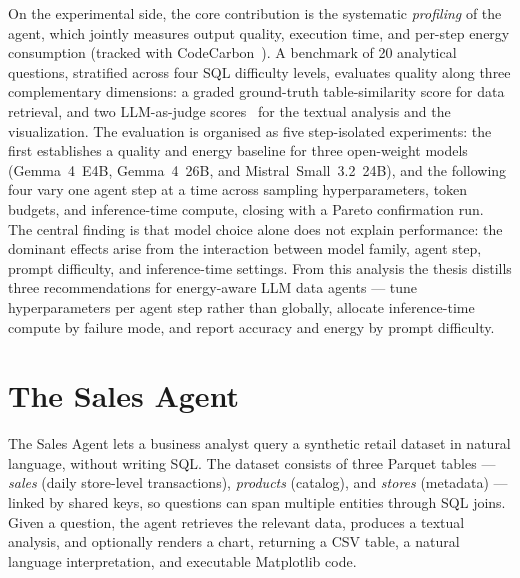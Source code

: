 \documentclass[11pt,a4paper,twocolumn]{article}
\begin{document}
On the experimental side, the core contribution is the systematic \emph{profiling} of the agent,
which jointly measures output quality, execution time, and per-step energy consumption (tracked
with CodeCarbon~\cite{lottick2019codecarbon}). A benchmark of 20 analytical questions, stratified
across four SQL difficulty levels, evaluates quality along three complementary dimensions: a
graded ground-truth table-similarity score for data retrieval, and two LLM-as-judge
scores~\cite{zheng2023judging} for the textual analysis and the visualization. The evaluation is
organised as five step-isolated experiments: the first establishes a quality and energy baseline
for three open-weight models (Gemma~4~E4B, Gemma~4~26B, and Mistral~Small~3.2~24B), and the
following four vary one agent step at a time across sampling hyperparameters, token budgets, and
inference-time compute, closing with a Pareto confirmation run. The central finding is that model
choice alone does not explain performance: the dominant effects arise from the interaction between
model family, agent step, prompt difficulty, and inference-time settings. From this analysis the
thesis distills three recommendations for energy-aware LLM data agents --- tune hyperparameters
per agent step rather than globally, allocate inference-time compute by failure mode, and report
accuracy and energy by prompt difficulty.

\section{The Sales Agent}
\label{sec:es_application}

The Sales Agent lets a business analyst query a synthetic retail dataset in natural
language, without writing SQL. The dataset consists of three Parquet tables ---
\textit{sales} (daily store-level transactions), \textit{products} (catalog), and
\textit{stores} (metadata) --- linked by shared keys, so questions can span multiple
entities through SQL joins. Given a question, the agent retrieves the relevant data,
produces a textual analysis, and optionally renders a chart, returning a CSV table, a
natural language interpretation, and executable Matplotlib code.
\end{document}
